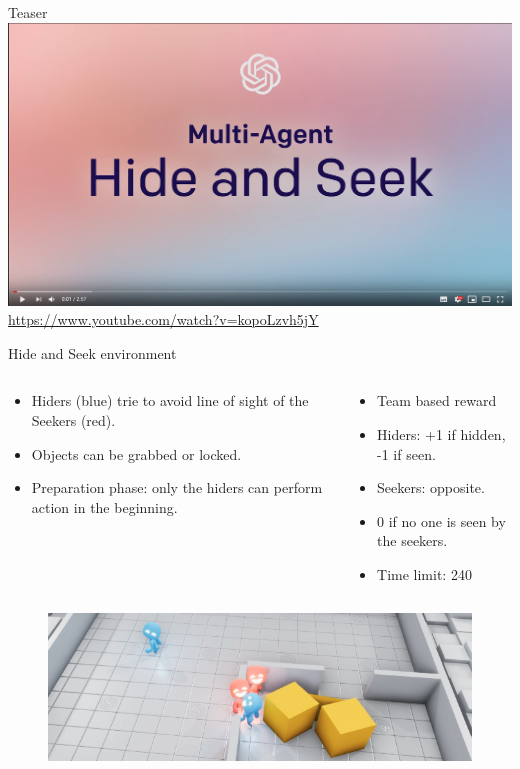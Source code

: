 \documentclass[9pt, hyperref={pdfusetitle,colorlinks=true,allcolors=DarkBlue}]{beamer}
\begin{document}
\begin{frame}{Teaser}
\centering
\includegraphics[scale=0.25]{teaser.png}
\url{https://www.youtube.com/watch?v=kopoLzvh5jY}
\end{frame}{}
\begin{frame}{Hide and Seek environment}

\begin{columns}
\begin{column}{0.5\textwidth}
\begin{itemize}
        \item Hiders (blue) trie to avoid line of sight of the Seekers (red).
        \item Objects can be grabbed or locked.
        \item Preparation phase: only the hiders can perform action in the beginning.
    \end{itemize}{}
\end{column}
\begin{column}{0.5\textwidth}  %
    \begin{itemize}
        \item Team based reward
        \item Hiders: +1 if hidden, -1 if seen.
        \item Seekers: opposite.
        \item 0 if no one is seen by the seekers.
        \item Time limit: 240
    \end{itemize}{}
\end{column}
\end{columns}
\begin{figure}
\includegraphics[scale=0.4]{hasenv.png}
\end{figure}
\end{frame}{}
\end{document}
